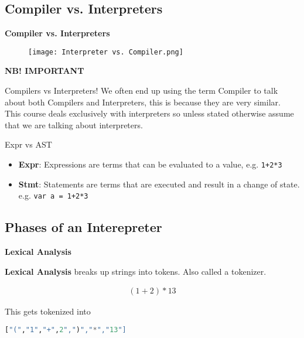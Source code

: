 \subsection{Compiler vs. Interpreters}
\begin{frame}{\textbf{Compiler vs. Interpreters}}
    \begin{figure}
        \texttt{[image: Interpreter vs. Compiler.png]}   
    \end{figure}
\end{frame}


\begin{frame}{\textbf{NB! IMPORTANT}}
    \begin{alertblock}{Compilers vs Interpreters!}
        We often end up using the term Compiler to talk about both Compilers and Interpreters, this is because they are very similar.\\
        This course deals exclusively with interpreters so unless stated otherwise assume that we are talking about interpreters.
    \end{alertblock}
    \begin{alertblock}{Expr vs AST}
        \begin{itemize}
            \item \textbf{Expr}: Expressions are terms that can be evaluated to a value, e.g. \texttt{1+2*3}
            \item \textbf{Stmt}: Statements are terms that are executed and result in a change of state. e.g. \texttt{var a = 1+2*3}
        \end{itemize}
    \end{alertblock}
\end{frame}

\subsection{Phases of an Interepreter}
\begin{frame}[fragile]{\textbf{Lexical Analysis}}
    \begin{block}{}
        \textbf{Lexical Analysis} breaks up strings into tokens. Also called a tokenizer.
    \end{block}
    \begin{example}
        \begin{figure}
            \centering
            \Large
            \begin{align*}
                (1+2)*13
            \end{align*}
        \end{figure}
        This gets tokenized into 
        \begin{lstlisting}[language=Haskell]
    ["(","1","+",2",")","*","13"]
        \end{lstlisting}
    \end{example}
\end{frame}

